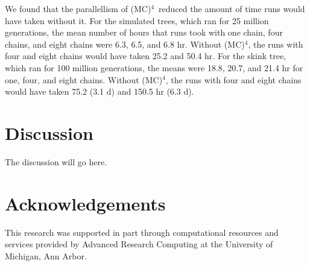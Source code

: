 \documentclass[12pt]{article}
\newcommand{\MCMCMCMC}{(MC)$^{4}$}
\begin{document}
We found that the parallellism of \MCMCMCMC\ 
reduced the amount of time runs would have taken without it.
%
For the simulated trees, which ran for 25 million generations,
the mean number of hours that runs took with
one chain, four chains, and eight chains were
6.3, 6.5, and 6.8 hr.
%
Without \MCMCMCMC, the runs with four and eight chains
would have taken 25.2 and 50.4 hr.
%
For the skink tree, which ran for 100 million generations,
the means were 18.8, 20.7, and 21.4 hr for one, four, and eight chains.
%
Without \MCMCMCMC, the runs with four and eight chains
would have taken 75.2 (3.1 d) and 150.5 hr (6.3 d).


\section*{Discussion}

The discussion will go here.


\section*{Acknowledgements}

This research was supported in part through computational resources
and services provided by Advanced Research Computing
at the University of Michigan, Ann Arbor.



\end{document}
